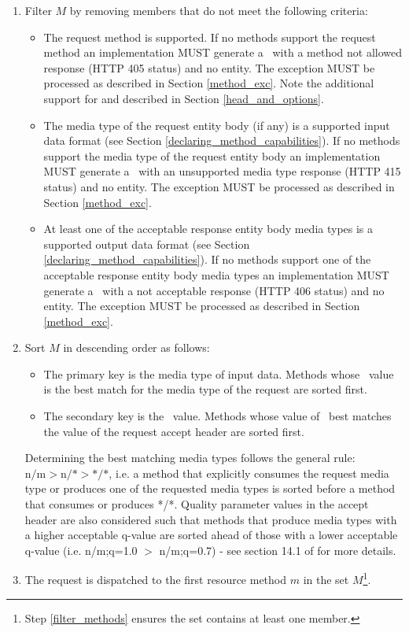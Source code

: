 \begin{enumerate}
\begin{enumerate}
\item \label{filter_methods} Filter $M$ by removing members that do not meet the following criteria:
\begin{itemize}
\item The request method is supported. If no methods support the request method an implementation MUST generate a \WebAppExc\ with a method not allowed response (HTTP 405 status) and no entity. The exception MUST be processed as described in Section \ref{method_exc}. Note the additional support for  and  described in Section \ref{head_and_options}.
\item The media type of the request entity body (if any) is a supported input data format (see Section \ref{declaring_method_capabilities}). If no methods support the media type of the request entity body an implementation MUST generate a \WebAppExc\ with an unsupported media type response (HTTP 415 status) and no entity. The exception MUST be processed as described in Section \ref{method_exc}.
\item At least one of the acceptable response entity body media types is a supported output data format (see Section \ref{declaring_method_capabilities}). If no methods support one of the acceptable response entity body media types an implementation MUST generate a \WebAppExc\ with a not acceptable response (HTTP 406 status) and no entity. The exception MUST be processed as described in Section \ref{method_exc}.
\end{itemize} 
\item Sort $M$ in descending order as follows:
\begin{itemize}
\item The primary key is the media type of input data. Methods whose \Consumes\ value is the best match for the media type of the request are sorted first.
\item The secondary key is the \Produces\ value. Methods whose value of \Produces\ best matches the value of the request accept header are sorted first.
\end{itemize}

Determining the best matching media types follows the general rule: $\mbox{n/m} > \mbox{n/*} > \mbox{*/*}$, i.e. a method that explicitly consumes the request media type or produces one of the requested media types is sorted before a method that consumes or produces */*. Quality parameter values in the accept header are also considered such that methods that produce media types with a higher acceptable q-value are sorted ahead of those with a lower acceptable q-value (i.e. n/m;q=1.0 $>$ n/m;q=0.7) - see section 14.1 of \cite{http11} for more details.

\item \label{dispatch_method} The request is dispatched to the first resource method $m$ in the set $M$\footnote{Step \ref{filter_methods} ensures the set contains at least one member.}.
\end{enumerate}

\end{enumerate}

